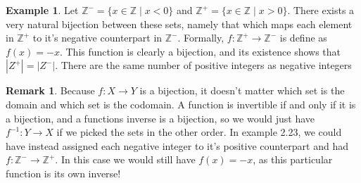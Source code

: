 \documentclass{article}
\newcommand{\Z}{\mathbb{Z}}
\theoremstyle{definition}
\newtheorem{example}{Example}[section]
\newtheorem{remark}{Remark}[section]
\begin{document}
	\begin{example}
		Let $ \Z^-=\{x\in\Z\mid x<0\} $ and $ \Z^+=\{x\in\Z\mid x>0\} $. There exists a very natural bijection between these sets, namely that which maps each element in $ \Z^+ $ to it's negative counterpart in $ \Z^- $. Formally, $ f:\Z^+\to\Z^- $ is define as $ f(x)=-x $. This function is clearly a bijection, and its existence shows that $ |Z^+|=|Z^-| $. There are the same number of positive integers as negative integers  
	\end{example}
	\begin{remark}
		Because $ f:X\to Y $ is a bijection, it doesn't matter which set is the domain and which set is the codomain. A function is invertible if and only if it is a bijection, and a functions inverse is a bijection, so we would just have $ f^{-1}:Y\to X $ if we picked the sets in the other order. In example 2.23, we could have instead assigned each negative integer to it's positive counterpart and had $ f:\Z^-\to\Z^+ $. In this case we would still have $ f(x)=-x $, as this particular function is its own inverse! 
	\end{remark}
	
\end{document}

